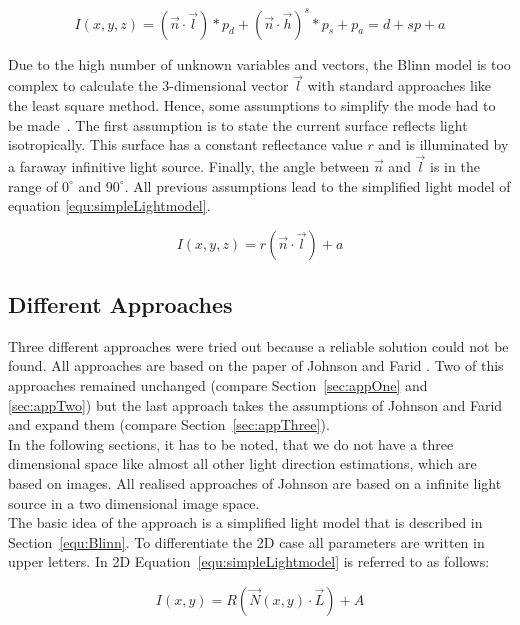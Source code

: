 \begin{equation}
\label{equ:Blinn}
I(x,y,z) = (\vec{n}\cdot \vec{l})*p_d + (\vec{n}\cdot\vec{h})^s*p_s + p_a = d + sp + a
\end{equation} 

Due to the high number of unknown variables and vectors, the Blinn model is too complex to calculate the 3-dimensional vector $\vec{l}$ with standard approaches like the least square method. Hence, some assumptions to simplify the mode had to be made~\cite{Johnson}. The first assumption is to state the current surface reflects light isotropically. This surface has a constant reflectance value $r$ and is illuminated by a faraway infinitive light source. Finally, the angle between $\vec{n}$ and  $\vec{l}$ is in the range of $0^\circ $ and $90^\circ$. All previous assumptions lead to the simplified light model of equation \ref{equ:simpleLightmodel}.

\begin{equation}
\label{equ:simpleLightmodel}
I(x,y,z) = r(\vec{n}\cdot \vec{l}) + a
\end{equation} 

\subsection{Different Approaches}\label{sec:approaches}
Three different approaches were tried out because a reliable solution could not be found. All approaches are based on the paper of Johnson and Farid \cite{Johnson}. 
Two of this approaches remained unchanged (compare Section~\ref{sec:appOne} and \ref{sec:appTwo}) but the last approach takes the assumptions of Johnson and Farid and expand them (compare Section~\ref{sec:appThree}). \\
In the following sections, it has to be noted, that we do not have a three dimensional space like almost all other light direction estimations, which are based on images. All realised approaches of Johnson are based on a infinite light source in a two dimensional image space. \\
The basic idea of the approach is a simplified light model that is described in Section~\ref{equ:Blinn}. To differentiate the 2D case all parameters are written in upper letters. In 2D Equation~\ref{equ:simpleLightmodel} is referred to as follows:

\begin{equation}
\label{equ:General}
I(x,y) = R(\vec{N}(x,y)\cdot \vec{L}) + A
\end{equation}

